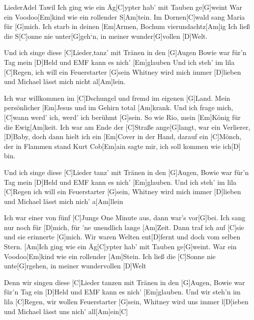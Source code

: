 \documentclass[../main.tex]{subfiles}
\begin{document}
\begin{song}[3]{Lieder}{Adel Tawil}{}
Ich ging wie ein Äg[C]ypter hab' mit Tauben ge[G]weint
War ein Voodoo[Em]kind wie ein rollender S[Am]tein.
Im Dornen[C]wald sang Maria für [G]mich.
Ich starb in deinen [Em]Armen, Bochum vierundachtz[Am]ig
Ich ließ die S[C]onne nie unter[G]geh`n, in meiner wunder[G]vollen [D]Welt.

Und ich singe diese [C]Lieder,tanz' mit Tränen in den [G]Augen
Bowie war für'n Tag mein [D]Held und EMF kann es nich' [Em]glauben
Und ich steh' im lila [C]Regen, ich will ein Feuerstarter [G]sein
Whitney wird mich immer [D]lieben und Michael lässt mich nicht al[Am]lein.

Ich war willkommen im [C]Dschungel und fremd im eigenen [G]Land.
Mein persönlicher [Em]Jesus und im Gehirn total [Am]krank.
Und ich frage mich, [C]wann werd' ich, werd' ich berühmt [G]sein.
So wie Rio, mein [Em]König für die Ewig[Am]keit.
Ich war am Ende der [C]Straße ange[G]langt,
war ein Verlierer, [D]Baby, doch dann hielt ich ein [Em]Cover in der Hand,
darauf ein [C]Mönch, der in Flammen stand
Kurt Cob[Em]ain sagte mir, ich soll kommen wie ich[D] bin.

Und ich singe diese [C]Lieder tanz' mit Tränen in den [G]Augen,
Bowie war für'n Tag mein [D]Held und EMF kann es nich' [Em]glauben.
Und ich steh' im lila [C]Regen ich will ein Feuerstarter [G]sein,
Whitney wird mich immer [D]lieben und Michael lässt mich nich' a[Am]llein\

Ich war einer von fünf [C]Jungs \glqq{}One Minute\grqq{} aus, dann war's vor[G]bei.
Ich sang nur noch für [D]mich, für 'ne unendlich lange [Am]Zeit.
Dann traf ich auf [C]sie und sie erinnerte [G]mich.
Wir waren Welten ent[D]fernt und doch vom selben Stern.
[Am]Ich ging wie ein Äg[C]ypter hab' mit Tauben ge[G]weint.
War ein Voodoo[Em]kind wie ein rollender [Am]Stein.
Ich ließ die [C]Sonne nie unte[G]rgehen, in meiner wundervollen [D]Welt

Denn wir singen diese [C]Lieder tanzen mit Tränen in den [G]Augen,
Bowie war für'n Tag ein [D]Held und EMF kann es nich' [Em]glauben.
Und wir steh'n im lila [C]Regen, wir wollen  Feuerstarter [G]sein,
Whitney wird uns immer l[D]ieben und Michael lässt uns nich' all[Am]ein[C]

\end{song}
\end{document}
